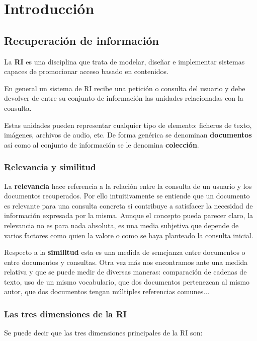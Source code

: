 \chapter{Introducción}
\section{Recuperación de información}
La \textbf{\acrfull{RI}} es una disciplina que trata de modelar, diseñar e implementar sistemas capaces de promocionar acceso basado en contenidos. \cite{RIspaBook}

En general un sistema de \acrshort{RI} recibe una petición o consulta  del usuario y debe devolver de entre su conjunto de información las unidades relacionadas con la consulta. 

Estas unidades pueden representar cualquier tipo de elemento: ficheros de texto, imágenes, archivos de audio, etc. De forma genérica se denominan \textbf{documentos} así como al conjunto de información se le denomina \textbf{colección}.



\subsection{Relevancia y similitud}
La \textbf{relevancia} hace referencia a la relación entre la consulta de un usuario y los documentos recuperados. Por ello intuitivamente se entiende que un documento es relevante para una consulta concreta si contribuye a satisfacer la necesidad de información expresada por la misma. Aunque el concepto pueda parecer claro, la relevancia no es para nada absoluta, es una media subjetiva que depende de varios factores como quien la valore o como se haya planteado la consulta inicial.

Respecto a la \textbf{similitud} esta es una medida de semejanza entre documentos o entre documentos y consultas. Otra vez más nos encontramos ante una medida relativa y que se puede medir de diversas maneras: comparación de cadenas de texto, uso de un mismo vocabulario, que dos documentos pertenezcan al mismo autor, que dos documentos tengan múltiples referencias comunes...\cite{ApuntesRI}


\subsection{Las tres dimensiones de la \acrshort{RI}}
Se puede decir que las tres dimensiones principales de la \acrshort{RI} son:\cite{RIspaBook}

